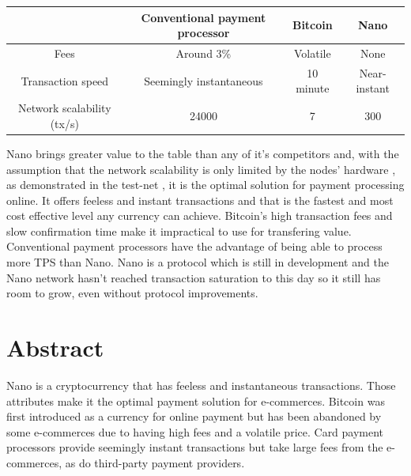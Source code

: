 \documentclass{ferseminar}
\begin{document}
\begin{center}
	\begin{tabular}{ |c||c|c|c| }
		\hline
		& Conventional payment processor & Bitcoin & Nano\\ 
		\hline\hline
		Fees & Around 3\% & Volatile & None\\  
		\hline
		Transaction speed & Seemingly instantaneous & 10 minute & Near-instant\\
		\hline
		Network scalability (tx/s) & 24000 & 7 & 300\\
		\hline
	\end{tabular}
\end{center}

Nano brings greater value to the table than any of it's competitors and, with the assumption that the network scalability is only limited by the nodes' hardware \cite{Nano}, as demonstrated in the test-net \cite{github}, it is the optimal solution for payment processing online. It offers feeless and instant transactions and that is the fastest and most cost effective level any currency can achieve.
Bitcoin's high transaction fees and slow confirmation time make it impractical to use for transfering value. 
Conventional payment processors have the advantage of being able to process more TPS than Nano. Nano is a protocol which is still in development and the Nano network hasn't reached transaction saturation to this day so it still has room to grow, even without protocol improvements. 
\section{Abstract}
Nano is a cryptocurrency that has feeless and instantaneous transactions. Those attributes make it the optimal payment solution for e-commerces. Bitcoin was first introduced as a currency for online payment but has been abandoned by some e-commerces due to having high fees and a volatile price. Card payment processors provide seemingly instant transactions but take large fees from the e-commerces, as do third-party payment providers.  
\end{document}

